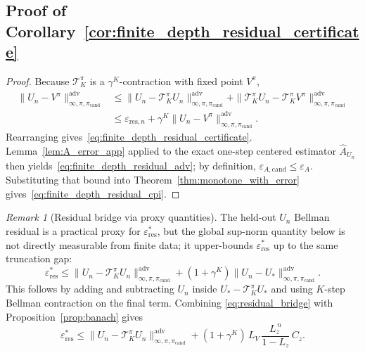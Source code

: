 \documentclass{article}
\theoremstyle{plain}
\theoremstyle{definition}
\theoremstyle{remark}
\newtheorem{remark}[theorem]{Remark}
\begin{document}
\subsection{Proof of Corollary~\ref{cor:finite_depth_residual_certificate}}
\label{app:proof_finite_depth_certificate}

\begin{proof}
Because $\mathcal{T}^\pi_K$ is a $\gamma^K$-contraction with fixed point $V^\pi$,
\begin{align*}
\|U_n-V^\pi\|_{\infty,\pi,\pi_{\mathrm{cand}}}^{\mathrm{adv}}
&\le
\|U_n-\mathcal{T}^\pi_K U_n\|_{\infty,\pi,\pi_{\mathrm{cand}}}^{\mathrm{adv}}
+
\|\mathcal{T}^\pi_K U_n-\mathcal{T}^\pi_K V^\pi\|_{\infty,\pi,\pi_{\mathrm{cand}}}^{\mathrm{adv}} \\
&\le
\varepsilon_{\mathrm{res},n}
+
\gamma^K\|U_n-V^\pi\|_{\infty,\pi,\pi_{\mathrm{cand}}}^{\mathrm{adv}}.
\end{align*}
Rearranging gives~\eqref{eq:finite_depth_residual_certificate}. Lemma~\ref{lem:A_error_app} applied to the exact one-step centered estimator $\widehat A_{U_n}$ then yields~\eqref{eq:finite_depth_residual_adv}; by definition, $\varepsilon_{A,\mathrm{cand}}\le\varepsilon_A$. Substituting that bound into Theorem~\ref{thm:monotone_with_error} gives~\eqref{eq:finite_depth_residual_cpi}.
\end{proof}

\begin{remark}[Residual bridge via proxy quantities]
\label{rem:residual_bridge}
The held-out $U_n$ Bellman residual is a practical proxy for $\varepsilon_{\mathrm{res}}^*$, but the global sup-norm quantity below is not directly measurable from finite data; it upper-bounds $\varepsilon_{\mathrm{res}}^*$ up to the same truncation gap:
\begin{equation}
\varepsilon_{\mathrm{res}}^*
\le
\|U_n-\mathcal{T}^\pi_K U_n\|_{\infty,\pi,\pi_{\mathrm{cand}}}^{\mathrm{adv}}
+
(1+\gamma^K)\|U_n-U_*\|_{\infty,\pi,\pi_{\mathrm{cand}}}^{\mathrm{adv}}.
\label{eq:residual_bridge}
\end{equation}
This follows by adding and subtracting $U_n$ inside $U_*-\mathcal{T}^\pi_K U_*$ and using $K$-step Bellman contraction on the final term. Combining \eqref{eq:residual_bridge} with Proposition~\ref{prop:banach} gives
\begin{equation}
\varepsilon_{\mathrm{res}}^*
\le
\|U_n-\mathcal{T}^\pi_K U_n\|_{\infty,\pi,\pi_{\mathrm{cand}}}^{\mathrm{adv}}
+
(1+\gamma^K)\,L_V\,\frac{L_z^{\,n}}{1-L_z}\,C_z.
\label{eq:residual_bridge_trunc}
\end{equation}
\end{remark}
\end{document}
